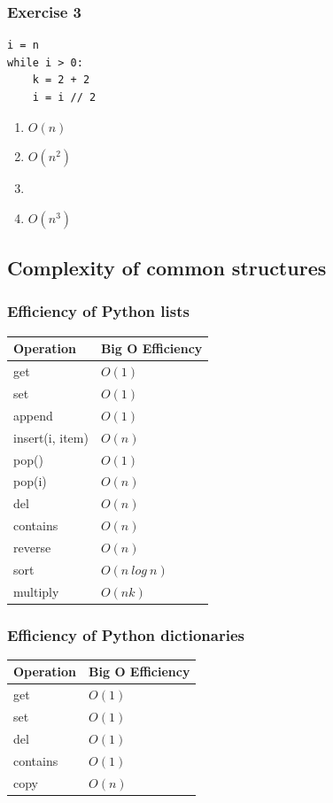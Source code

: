 \documentclass[11pt]{beamer}
\begin{document}
\begin{frame}[fragile]\frametitle{Exercise 3}
\begin{lstlisting}
i = n
while i > 0:
	k = 2 + 2
	i = i // 2
\end{lstlisting}
\begin{enumerate}
\item $O(n)$
\item $O(n^2)$
\item  {}
\item $O(n^3)$
\end{enumerate}
\end{frame}

\subsection{Complexity of common structures}

\begin{frame}\frametitle{Efficiency of Python lists}
\begin{center}
\begin{tabular}{l|l}
\hline
\textbf{Operation} &\textbf{ Big O Efficiency} \\
\hline
get & $O(1)$ \\
set & $O(1)$ \\
append & $O(1)$ \\
insert(i, item) & $O(n)$ \\
pop() & $O(1)$ \\
pop(i) & $O(n)$ \\
del & $O(n)$ \\
contains & $O(n)$ \\
reverse & $O(n)$ \\
sort & $O(n\ log\ n)$ \\
multiply & $O(nk)$ \\
\end{tabular}
\end{center}
\end{frame}


\begin{frame}\frametitle{Efficiency of Python dictionaries}
\begin{center}
\begin{tabular}{l|l}
\hline
\textbf{Operation} &\textbf{ Big O Efficiency} \\
\hline
get & $O(1)$ \\
set & $O(1)$ \\
del & $O(1)$ \\
contains & $O(1)$ \\
copy & $O(n)$ \\
\end{tabular}
\end{center}
\end{frame}
\end{document}

